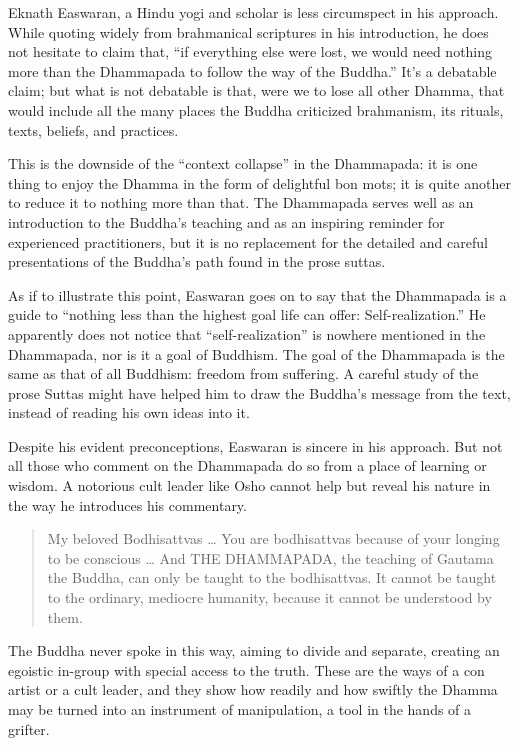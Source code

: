 \documentclass[12pt,openany]{book}%
\begin{document}
Eknath Easwaran, a Hindu yogi and scholar is less circumspect in his approach. While quoting widely from brahmanical scriptures in his introduction, he does not hesitate to claim that, “if everything else were lost, we would need nothing more than the Dhammapada to follow the way of the Buddha.” It’s a debatable claim; but what is not debatable is that, were we to lose all other Dhamma, that would include all the many places the Buddha criticized brahmanism, its rituals, texts, beliefs, and practices.

This is the downside of the “context collapse” in the Dhammapada: it is one thing to enjoy the Dhamma in the form of delightful bon mots; it is quite another to reduce it to nothing more than that. The Dhammapada serves well as an introduction to the Buddha’s teaching and as an inspiring reminder for experienced practitioners, but it is no replacement for the detailed and careful presentations of the Buddha’s path found in the prose suttas.

As if to illustrate this point, Easwaran goes on to say that the Dhammapada is a guide to “nothing less than the highest goal life can offer: Self-realization.” He apparently does not notice that “self-realization” is nowhere mentioned in the Dhammapada, nor is it a goal of Buddhism. The goal of the Dhammapada is the same as that of all Buddhism: freedom from suffering. A careful study of the prose Suttas might have helped him to draw the Buddha’s message from the text, instead of reading his own ideas into it.

Despite his evident preconceptions, Easwaran is sincere in his approach. But not all those who comment on the Dhammapada do so from a place of learning or wisdom. A notorious cult leader like Osho cannot help but reveal his nature in the way he introduces his commentary.

\begin{quotation}%
My beloved Bodhisattvas … You are bodhisattvas because of your longing to be conscious … And THE DHAMMAPADA, the teaching of Gautama the Buddha, can only be taught to the bodhisattvas. It cannot be taught to the ordinary, mediocre humanity, because it cannot be understood by them.

%
\end{quotation}

The Buddha never spoke in this way, aiming to divide and separate, creating an egoistic in-group with special access to the truth. These are the ways of a con artist or a cult leader, and they show how readily and how swiftly the Dhamma may be turned into an instrument of manipulation, a tool in the hands of a grifter.
\end{document}
